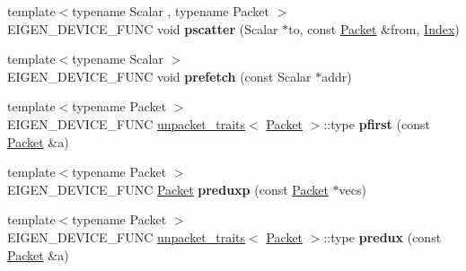 \begin{DoxyCompactItemize}
\item 
\mbox{\label{namespace_eigen_1_1internal_a8ec395bc54b860a3f62a879fec09cf19}} 
{\footnotesize template$<$typename Scalar , typename Packet $>$ }\\E\+I\+G\+E\+N\+\_\+\+D\+E\+V\+I\+C\+E\+\_\+\+F\+U\+NC void {\bfseries pscatter} (Scalar $\ast$to, const \hyperlink{union_eigen_1_1internal_1_1_packet}{Packet} \&from, \hyperlink{namespace_eigen_a62e77e0933482dafde8fe197d9a2cfde}{Index})
\item 
\mbox{\label{namespace_eigen_1_1internal_a557119ca2ecbb5fc69ad064afe8bca3f}} 
{\footnotesize template$<$typename Scalar $>$ }\\E\+I\+G\+E\+N\+\_\+\+D\+E\+V\+I\+C\+E\+\_\+\+F\+U\+NC void {\bfseries prefetch} (const Scalar $\ast$addr)
\item 
\mbox{\label{namespace_eigen_1_1internal_aca8ce931f75f798f8222ae308a8d99a2}} 
{\footnotesize template$<$typename Packet $>$ }\\E\+I\+G\+E\+N\+\_\+\+D\+E\+V\+I\+C\+E\+\_\+\+F\+U\+NC \hyperlink{struct_eigen_1_1internal_1_1unpacket__traits}{unpacket\+\_\+traits}$<$ \hyperlink{union_eigen_1_1internal_1_1_packet}{Packet} $>$\+::type {\bfseries pfirst} (const \hyperlink{union_eigen_1_1internal_1_1_packet}{Packet} \&a)
\item 
\mbox{\label{namespace_eigen_1_1internal_a731758e92a3e62898266e2466aaa72a8}} 
{\footnotesize template$<$typename Packet $>$ }\\E\+I\+G\+E\+N\+\_\+\+D\+E\+V\+I\+C\+E\+\_\+\+F\+U\+NC \hyperlink{union_eigen_1_1internal_1_1_packet}{Packet} {\bfseries preduxp} (const \hyperlink{union_eigen_1_1internal_1_1_packet}{Packet} $\ast$vecs)
\item 
\mbox{\label{namespace_eigen_1_1internal_a1374897acbe2e3e2692a7ce362939a6a}} 
{\footnotesize template$<$typename Packet $>$ }\\E\+I\+G\+E\+N\+\_\+\+D\+E\+V\+I\+C\+E\+\_\+\+F\+U\+NC \hyperlink{struct_eigen_1_1internal_1_1unpacket__traits}{unpacket\+\_\+traits}$<$ \hyperlink{union_eigen_1_1internal_1_1_packet}{Packet} $>$\+::type {\bfseries predux} (const \hyperlink{union_eigen_1_1internal_1_1_packet}{Packet} \&a)
\item 

\end{DoxyCompactItemize}
